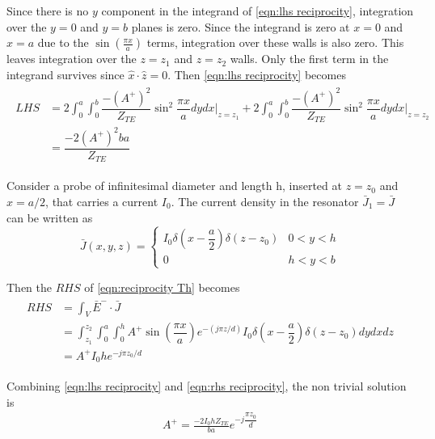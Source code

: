 Since there is no $y$ component in the integrand of \ref{eqn:lhs reciprocity}, integration over the $y=0$ and $y=b$ planes is zero.
Since the integrand is zero at $x=0$ and $x=a$ due to the $\sin\left(\tfrac{\pi x}{a}\right)$ terms, integration over these walls is also zero.
This leaves integration over the $z=z_1$ and $z=z_2$ walls.
Only the first term in the integrand survives since $\hat{x}\cdot\hat{z}=0$. Then \ref{eqn:lhs reciprocity} becomes
\begin{align}
\begin{split}
LHS&=2\int^a_0\int^b_0 \dfrac{-(A^+)^2}{Z_{TE}}\sin^2\dfrac{\pi x}{a}dydx\bigg|_{z=z_1} + 2\int^a_0\int^b_0 \dfrac{-(A^+)^2}{Z_{TE}}\sin^2\dfrac{\pi x}{a}dydx\bigg|_{z=z_2}\\
&=\dfrac{-2(A^+)^2ba}{Z_{TE}}
\end{split}
\end{align}

Consider a probe of infinitesimal diameter and length h, inserted at $z=z_0$ and $x=a/2$, that carries a current $I_0$. The current density in the resonator $\bar{J}_1=\bar{J}$ can be written as
\begin{equation}
\bar{J}(x,y,z)=
\begin{cases}
I_0\delta\left(x-\dfrac{a}{2}\right)\delta(z-z_0)&0<y<h\\
0&h<y<b
\end{cases}
\end{equation}

Then the $RHS$ of \ref{eqn:reciprocity Th} becomes
\begin{align}
\begin{split}
\label{eqn:rhs reciprocity}
RHS&=\int_V\bar{E}^-\cdot\bar{J}\\
&=\int^{z_2}_{z_1}\int^a_0\int^h_0 A^+\sin\left(\dfrac{\pi x}{a}\right)e^{-(j\pi z/d)}I_0\delta\left(x-\dfrac{a}{2}\right)\delta(z-z_0)dydxdz\\
&=A^+I_0he^{-j\pi z_0/d}
\end{split}
\end{align}

Combining \ref{eqn:lhs reciprocity} and \ref{eqn:rhs reciprocity}, the non trivial solution is
\begin{align}
A^+=\frac{-2I_0hZ_{TE}}{ba}e^{-j\dfrac{\pi z_0}{d}}
\end{align}

